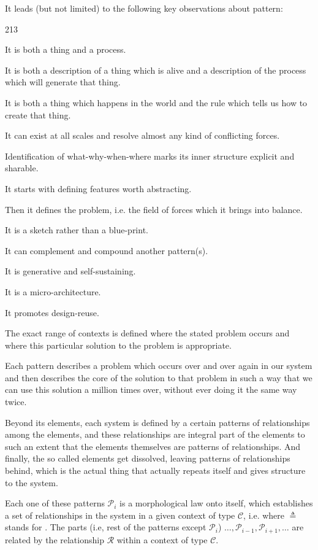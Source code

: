 It leads (but not limited) to the following  key observations about pattern:
\begin{dinglist}{213}
\item It is both a thing and a process.
\item It is both a description of a thing which is alive and a description of the process which will generate that thing.
\item It is both a thing which happens in the world and the rule which tells us how to create that thing.
\item It can exist at all scales and resolve almost any kind of conflicting forces.
\item Identification of what-why-when-where marks its inner structure explicit and sharable.
\item It starts with defining features worth abstracting.
\item Then it defines the problem, i.e. the field of forces which it brings into balance.
\item It is a sketch rather than a blue-print. 
\item It can complement and compound another pattern(s).
\item It is generative and self-sustaining.
\item It is a micro-architecture.
\item It promotes design-reuse.
\item The exact range of contexts is defined where the stated problem occurs and where this particular solution to the problem is appropriate.
\item Each pattern describes a problem which occurs over and over again in our system and then describes the core of the solution to that problem in such a way that we can use this solution a million times over, without ever doing it the same way twice.
\end{dinglist}

Beyond its elements, each system is defined by a certain patterns of relationships among the elements, and these relationships are integral part of the elements to such an extent that the elements themselves are patterns of relationships. And finally, the so called elements get dissolved, leaving patterns of relationships behind, which is the actual thing that actually repeats itself and gives structure to the system.

Each one of these patterns $\mathcal{P}_i$  is a morphological law onto itself, which establishes a set of relationships in the system in a given context of type $\mathcal{C}$, i.e.
where $\triangleq$ stands for . The parts (i.e, rest of the patterns except $\mathcal{P}_i$) $\ldots, \mathcal{P}_{i-1}, \mathcal{P}_{i+1}, \ldots$ are related by the relationship $\mathcal{R}$ within a context of type $\mathcal{C}$.

